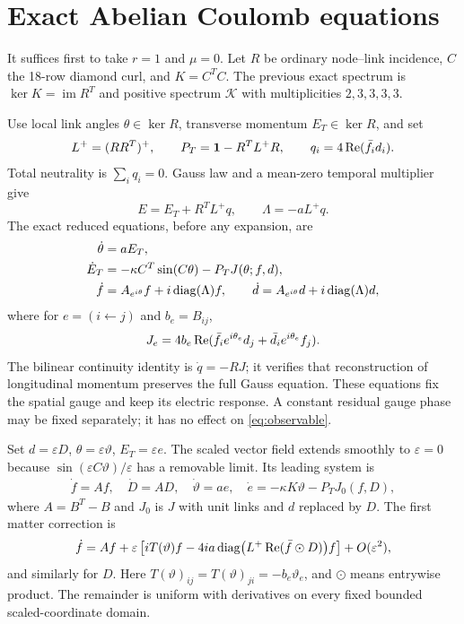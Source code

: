 \documentclass[11pt,a4paper]{article}
\newcommand{\id}{\mathbf1}\newcommand{\dd}{\mathrm d}\newcommand{\diag}{\operatorname{diag}}
\begin{document}
\newpage
\section{Exact Abelian Coulomb equations}
It suffices first to take $r=1$ and $\mu=0$. Let $R$ be ordinary node--link incidence, $C$ the 18-row diamond curl, and $K=C^TC$. The previous exact spectrum is $\ker K=\operatorname{im}R^T$ and positive spectrum $\mathcal K$ with multiplicities $2,3,3,3,3$.

Use local link angles $\theta\in\ker R$, transverse momentum $E_T\in\ker R$, and set
\[
L^+=(RR^T)^+,\qquad P_T=\id-R^TL^+R,
\qquad q_i=4\Rea(\bar f_i d_i).
\]
Total neutrality is $\sum_iq_i=0$. Gauss law and a mean-zero temporal multiplier give
\begin{equation}
E=E_T+R^TL^+q,\qquad\Lambda=-aL^+q.
\end{equation}
The exact reduced equations, before any expansion, are
\begin{align}
\dot\theta&=aE_T,\notag\\
\dot E_T&=-\kappa C^T\sin(C\theta)-P_TJ(\theta;f,d),\label{eq:exactred}\\
\dot f&=A_{e^{i\theta}}f+i\diag(\Lambda)f,\qquad
\dot d=A_{e^{i\theta}}d+i\diag(\Lambda)d,\notag
\end{align}
where for $e=(i\leftarrow j)$ and $b_e=B_{ij}$,
\begin{equation}
J_e=4b_e\operatorname{Re}(\bar f_i e^{i\theta_e}d_j+\bar d_i e^{i\theta_e}f_j).
\end{equation}
The bilinear continuity identity is $\dot q=-RJ$; it verifies that reconstruction of longitudinal momentum preserves the full Gauss equation. These equations fix the spatial gauge and keep its electric response. A constant residual gauge phase may be fixed separately; it has no effect on \eqref{eq:observable}.

Set $d=\varepsilon D$, $\theta=\varepsilon\vartheta$, $E_T=\varepsilon e$. The scaled vector field extends smoothly to $\varepsilon=0$ because $\sin(\varepsilon C\vartheta)/\varepsilon$ has a removable limit. Its leading system is
\begin{align}
\dot f=Af,\quad\dot D=AD,\quad
\dot\vartheta=ae,\quad\dot e=-\kappa K\vartheta-P_TJ_0(f,D),\label{eq:leading}
\end{align}
where $A=B^T-B$ and $J_0$ is $J$ with unit links and $d$ replaced by $D$. The first matter correction is
\begin{equation}
\dot f=Af+\varepsilon\left[iT(\vartheta)f
-4ia\diag\bigl(L^+\Rea(\bar f\odot D)\bigr)f\right]+O(\varepsilon^2),\label{eq:firstf}
\end{equation}
and similarly for $D$. Here $T(\vartheta)_{ij}=T(\vartheta)_{ji}=-b_e\vartheta_e$, and $\odot$ means entrywise product. The remainder is uniform with derivatives on every fixed bounded scaled-coordinate domain.
\end{document}
